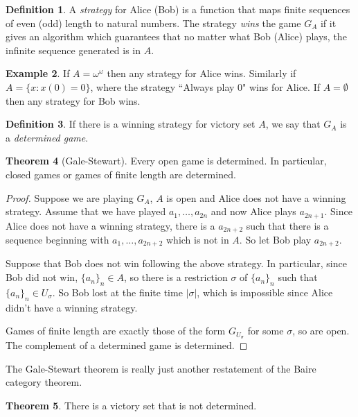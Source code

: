 \documentclass[12pt]{report}
\newcommand{\dfn}[1]{\emph{#1}\index{#1}}
\theoremstyle{definition}
\newtheorem{theorem}{Theorem}[chapter]
\newtheorem{definition}[theorem]{Definition}
\newtheorem{example}[theorem]{Example}
\begin{document}
\begin{definition}
A \dfn{strategy} for Alice (Bob) is a function that maps finite sequences of even (odd) length to natural numbers. The strategy \dfn{wins} the game $G_A$ if it gives an algorithm which guarantees that no matter what Bob (Alice) plays, the infinite sequence generated is in $A$.
\end{definition}
\begin{example}
If $A = \omega^\omega$ then any strategy for Alice wins. Similarly if $A = \{x: x(0) = 0\}$, where the strategy ``Always play 0" wins for Alice. If $A = \emptyset$ then any strategy for Bob wins.
\end{example}
\begin{definition}
If there is a winning strategy for victory set $A$, we say that $G_A$ is a \dfn{determined game}.
\end{definition}
\begin{theorem}[Gale-Stewart]
Every open game is determined. In particular, closed games or games of finite length are determined.
\end{theorem}
\begin{proof}
Suppose we are playing $G_A$, $A$ is open and Alice does not have a winning strategy.
Assume that we have played $a_1, \dots, a_{2n}$ and now Alice plays $a_{2n+1}$. Since Alice does not have a winning strategy,
there is a $a_{2n+2}$ such that there is a sequence beginning with $a_1, \dots, a_{2n+2}$ which is not in $A$.
So let Bob play $a_{2n + 2}$.

Suppose that Bob does not win following the above strategy.
In particular, since Bob did not win, $\{a_n\}_n \in A$, so there is a restriction $\sigma$ of $\{a_n\}_n$ such that $\{a_n\}_n \in U_\sigma$. So Bob lost at the finite time $|\sigma|$, which is impossible since Alice didn't have a winning strategy.

Games of finite length are exactly those of the form $G_{U_\sigma}$ for some $\sigma$, so are open. The complement of a determined game is determined.
\end{proof}
The Gale-Stewart theorem is really just another restatement of the Baire category theorem.
\begin{theorem}
There is a victory set that is not determined.
\end{theorem}
\end{document}
